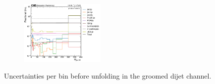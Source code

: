 \begin{figure}[ht!]
\begin{subfigure}
\end{subfigure}
  \begin{subfigure}
    \centering
    \includegraphics[width=0.45\textwidth]{figures/multijet/dijet/fracUnc_groomed_4.pdf}
\end{subfigure}
  \caption{Uncertainties per bin before unfolding in the groomed dijet channel.}
  \label{fig:dijetunc_groomed}
  \end{figure}
